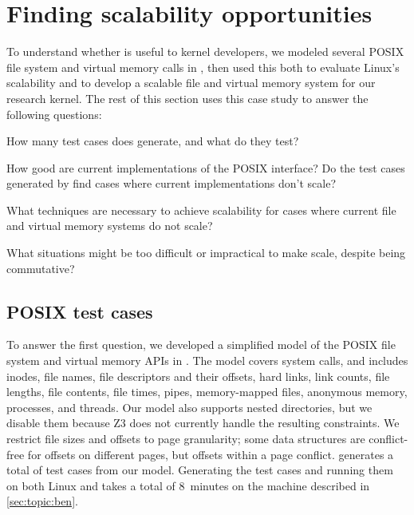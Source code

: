 \section{Finding scalability opportunities}
\label{sec:model}

To understand whether \tool{} is useful to kernel developers,
we modeled several POSIX file system and virtual memory calls in \tool,
then used this both to evaluate Linux's scalability and to develop a
scalable file and virtual memory system for our \sys research kernel.
%
The rest of this section uses this case study to answer the following
questions:

\begin{CompactItemize}

\item How many test cases does \tool{} generate, and what do they test?

\item How good are current implementations of the POSIX interface?
      Do the test cases generated by \tool{} find
      cases where current implementations don't scale?

\item What techniques are necessary to achieve scalability for
      cases where current file and virtual memory systems do not
      scale?

\item What situations might be too difficult or impractical to
      make scale, despite being commutative?

\end{CompactItemize}

\subsection{POSIX test cases}

To answer the first question, we developed a simplified model of the
POSIX file system and virtual memory APIs in \tool{}.  The model covers
 system
calls, and includes inodes, file
names, file descriptors and their offsets, hard links, link counts,
file lengths, file contents, file times, pipes, memory-mapped files,
anonymous memory, processes, and threads.  Our model
also supports nested
directories, but we disable them because Z3 does not currently handle
the resulting constraints.
%
We restrict file sizes and offsets to page granularity; some \sys data
structures are conflict-free for offsets on different pages, but
offsets within a page conflict.
%
\tool generates a total of  test cases
from our model.
%
Generating the test cases and running them on both Linux and \sys
takes a total of 8~minutes on the machine described in
\cref{sec:topic:ben}.

